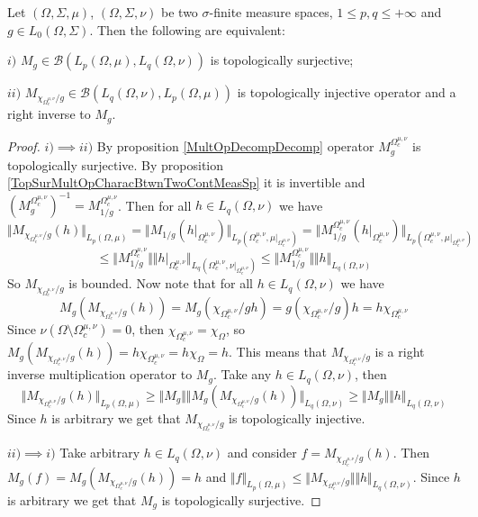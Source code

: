 \begin{proposition}\label{TopSurMultOpDescBtwnTwoMeasSp} Let $(\Omega,\Sigma,\mu)$, $(\Omega,\Sigma,\nu)$ be two $\sigma$-finite measure spaces, $1\leq p,q\leq +\infty$ and $g\in L_0(\Omega,\Sigma)$. Then the following are equivalent:

$i)$ $M_g\in\mathcal{B}(L_p(\Omega,\mu),L_q(\Omega,\nu))$ is topologically surjective;

$ii)$ $M_{\chi_{\Omega_c^{\mu,\nu}}/g}\in\mathcal{B}(L_q(\Omega,\nu), L_p(\Omega,\mu))$ is topologically injective operator and a right inverse to $M_g$.
\end{proposition}
\begin{proof}
$i)$$\implies$$ ii)$ By proposition \ref{MultOpDecompDecomp} operator $M_g^{\Omega_c^{\mu,\nu}}$ is topologically surjective. By proposition \ref{TopSurMultOpCharacBtwnTwoContMeasSp} it is invertible and $(M_g^{\Omega_c^{\mu,\nu}})^{-1}=M_{1/g}^{\Omega_c^{\mu,\nu}}$. Then for all $h\in L_q(\Omega,\nu)$ we have
$$
\Vert M_{\chi_{\Omega_c^{\mu,\nu}}/g}(h)\Vert_{L_p(\Omega,\mu)}=
\Vert M_{1/g}(h|_{\Omega_c^{\mu,\nu}})\Vert_{L_p(\Omega_c^{\mu,\nu},\mu|_{\Omega_c^{\mu,\nu}})}=
\Vert M_{1/g}^{\Omega_c^{\mu,\nu}}(h|_{\Omega_c^{\mu,\nu}})\Vert_{L_p(\Omega_c^{\mu,\nu},\mu|_{\Omega_c^{\mu,\nu}})}
$$
$$
\leq\Vert M_{1/g}^{\Omega_c^{\mu,\nu}}\Vert\Vert h|_{\Omega_c^{\mu,\nu}}\Vert_{L_q(\Omega_c^{\mu,\nu},\nu|_{\Omega_c^{\mu,\nu}})}
\leq\Vert M_{1/g}^{\Omega_c^{\mu,\nu}}\Vert\Vert h\Vert_{L_q(\Omega,\nu)}
$$ 
So $M_{\chi_{\Omega_c^{\mu,\nu}}/g}$ is bounded. Now note that for all $h\in L_q(\Omega,\nu)$ we have 
$$
M_g(M_{\chi_{\Omega_c^{\mu,\nu}}/g}(h))
=M_g(\chi_{\Omega_c^{\mu,\nu}}/g  h)
=g (\chi_{\Omega_c^{\mu,\nu}}/g)   h
=h \chi_{\Omega_c^{\mu,\nu}}
$$
Since $\nu(\Omega\setminus\Omega_c^{\mu,\nu})=0$, then $\chi_{\Omega_c^{\mu,\nu}}=\chi_{\Omega}$, so $M_g(M_{\chi_{\Omega_c^{\mu,\nu}}/g}(h))=h \chi_{\Omega_c^{\mu,\nu}}=h \chi_{\Omega}=h$. This means that $M_{\chi_{\Omega_c^{\mu,\nu}}/g}$ is a right inverse multiplication operator to $M_g$. Take any $h\in L_q(\Omega,\nu)$, then
$$
\Vert M_{\chi_{\Omega_c^{\mu,\nu}}/g}(h)\Vert_{L_p(\Omega,\mu)}
\geq\Vert M_g\Vert\Vert M_g(M_{\chi_{\Omega_c^{\mu,\nu}}/g}(h))\Vert_{L_q(\Omega,\nu)}
\geq\Vert M_g\Vert\Vert h\Vert_{L_q(\Omega,\nu)}
$$
Since $h$ is arbitrary we get that $M_{\chi_{\Omega_c^{\mu,\nu}}/g}$ is topologically injective.

$ii)$$\implies$$ i)$ Take arbitrary $h\in L_q(\Omega,\nu)$ and consider $f=M_{\chi_{\Omega_c^{\mu,\nu}}/g}(h)$. Then $M_g(f)=M_g(M_{\chi_{\Omega_c^{\mu,\nu}}/g}(h))=h$ and $\Vert f\Vert_{L_p(\Omega,\mu)}\leq\Vert M_{\chi_{\Omega_c^{\mu,\nu}}/g}\Vert\Vert h\Vert_{L_q(\Omega,\nu)}$. Since $h$ is arbitrary we get that $M_g$ is topologically surjective.
\end{proof}


